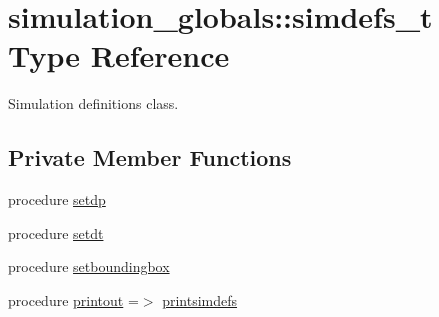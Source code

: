 \hypertarget{structsimulation__globals_1_1simdefs__t}{}\section{simulation\+\_\+globals\+:\+:simdefs\+\_\+t Type Reference}
\label{structsimulation__globals_1_1simdefs__t}


Simulation definitions class.  


\subsection*{Private Member Functions}
\begin{DoxyCompactItemize}
\item 
procedure \hyperlink{structsimulation__globals_1_1simdefs__t_ac1951dc05be68a08a70d55b0da627f04}{setdp}
\item 
procedure \hyperlink{structsimulation__globals_1_1simdefs__t_a1e748701b60ee8883871fb3bca30aa4b}{setdt}
\item 
procedure \hyperlink{structsimulation__globals_1_1simdefs__t_aae43bf7d19c5cfceb113c35bc13cca8d}{setboundingbox}
\item 
procedure \hyperlink{structsimulation__globals_1_1simdefs__t_aade8e069ae929a97a9c78cc52d1078f7}{printout} =$>$ \hyperlink{namespacesimulation__globals_ad90d6959da1d43e2cd1febff82187ed5}{printsimdefs}
\end{DoxyCompactItemize}
